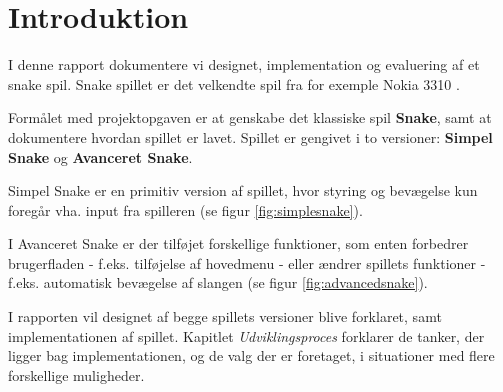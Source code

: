 \section{Introduktion}
I denne rapport dokumentere vi designet, implementation og evaluering af et snake spil. Snake spillet er det velkendte spil fra for exemple Nokia 3310 \cite{wiki_snake}. 

Formålet med projektopgaven er at genskabe det klassiske spil \textbf{Snake}, samt at dokumentere hvordan spillet er lavet.
Spillet er gengivet i to versioner: \textbf{Simpel Snake} og \textbf{Avanceret Snake}. 

Simpel Snake er en primitiv version af spillet, hvor styring og bevægelse kun foregår vha. input fra spilleren (se figur \ref{fig:simplesnake}). 

I Avanceret Snake er der tilføjet forskellige funktioner, som enten forbedrer brugerfladen - f.eks. tilføjelse af hovedmenu - eller ændrer spillets funktioner - f.eks. automatisk bevægelse af slangen (se figur \ref{fig:advancedsnake}).

I rapporten vil designet af begge spillets versioner blive forklaret, samt implementationen af spillet. Kapitlet \textit{Udviklingsproces} forklarer de tanker, der ligger bag implementationen, og de valg der er foretaget, i situationer med flere forskellige muligheder.
\linebreak

\begin{figure}[h]
	\centering
	\graphicspath{ {pics/} }
	\hspace{0.1\textwidth}
	\caption{}
\end{figure}